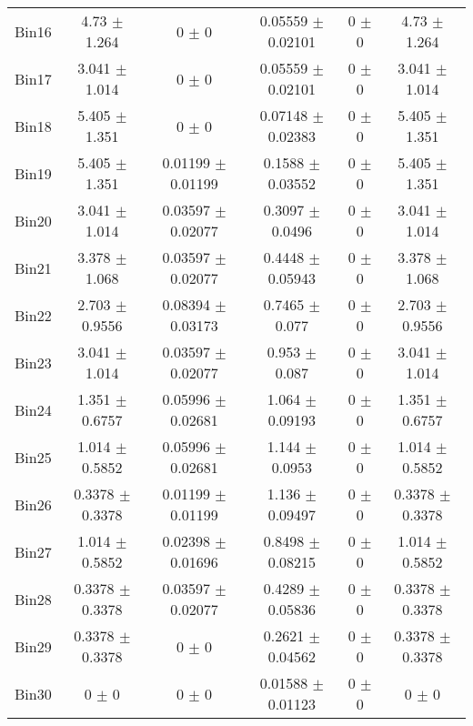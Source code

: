 \begin{tabular}{@{\extracolsep{4pt}}lccccc@{}}
     Bin16 & 4.73 $\pm$ 1.264 & 0 $\pm$ 0 & 0.05559 $\pm$ 0.02101 & 0 $\pm$ 0 & 4.73 $\pm$ 1.264 \\ 
     Bin17 & 3.041 $\pm$ 1.014 & 0 $\pm$ 0 & 0.05559 $\pm$ 0.02101 & 0 $\pm$ 0 & 3.041 $\pm$ 1.014 \\ 
     Bin18 & 5.405 $\pm$ 1.351 & 0 $\pm$ 0 & 0.07148 $\pm$ 0.02383 & 0 $\pm$ 0 & 5.405 $\pm$ 1.351 \\ 
     Bin19 & 5.405 $\pm$ 1.351 & 0.01199 $\pm$ 0.01199 & 0.1588 $\pm$ 0.03552 & 0 $\pm$ 0 & 5.405 $\pm$ 1.351 \\ 
     Bin20 & 3.041 $\pm$ 1.014 & 0.03597 $\pm$ 0.02077 & 0.3097 $\pm$ 0.0496 & 0 $\pm$ 0 & 3.041 $\pm$ 1.014 \\ 
     Bin21 & 3.378 $\pm$ 1.068 & 0.03597 $\pm$ 0.02077 & 0.4448 $\pm$ 0.05943 & 0 $\pm$ 0 & 3.378 $\pm$ 1.068 \\ 
     Bin22 & 2.703 $\pm$ 0.9556 & 0.08394 $\pm$ 0.03173 & 0.7465 $\pm$ 0.077 & 0 $\pm$ 0 & 2.703 $\pm$ 0.9556 \\ 
     Bin23 & 3.041 $\pm$ 1.014 & 0.03597 $\pm$ 0.02077 & 0.953 $\pm$ 0.087 & 0 $\pm$ 0 & 3.041 $\pm$ 1.014 \\ 
     Bin24 & 1.351 $\pm$ 0.6757 & 0.05996 $\pm$ 0.02681 & 1.064 $\pm$ 0.09193 & 0 $\pm$ 0 & 1.351 $\pm$ 0.6757 \\ 
     Bin25 & 1.014 $\pm$ 0.5852 & 0.05996 $\pm$ 0.02681 & 1.144 $\pm$ 0.0953 & 0 $\pm$ 0 & 1.014 $\pm$ 0.5852 \\ 
     Bin26 & 0.3378 $\pm$ 0.3378 & 0.01199 $\pm$ 0.01199 & 1.136 $\pm$ 0.09497 & 0 $\pm$ 0 & 0.3378 $\pm$ 0.3378 \\ 
     Bin27 & 1.014 $\pm$ 0.5852 & 0.02398 $\pm$ 0.01696 & 0.8498 $\pm$ 0.08215 & 0 $\pm$ 0 & 1.014 $\pm$ 0.5852 \\ 
     Bin28 & 0.3378 $\pm$ 0.3378 & 0.03597 $\pm$ 0.02077 & 0.4289 $\pm$ 0.05836 & 0 $\pm$ 0 & 0.3378 $\pm$ 0.3378 \\ 
     Bin29 & 0.3378 $\pm$ 0.3378 & 0 $\pm$ 0 & 0.2621 $\pm$ 0.04562 & 0 $\pm$ 0 & 0.3378 $\pm$ 0.3378 \\ 
     Bin30 & 0 $\pm$ 0 & 0 $\pm$ 0 & 0.01588 $\pm$ 0.01123 & 0 $\pm$ 0 & 0 $\pm$ 0 \\ 
\hline\hline
  \end{tabular}
